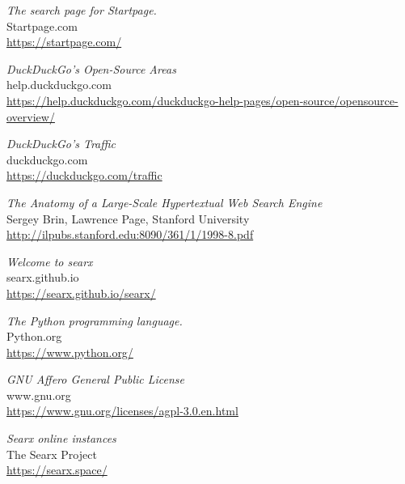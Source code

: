 \begin{thebibliography}{1}
    \emph{
    The search page for Startpage.
    }
    \\
    \color{gray}
    Startpage.com
    \\
    \color{black}
    \scriptsize
        \url{
            https://startpage.com/
        }
    \normalsize

    \emph{
    DuckDuckGo's Open-Source Areas
    }
    \\
    \color{gray}
    help.duckduckgo.com
    \\
    \color{black}
    \scriptsize
        \url{
            https://help.duckduckgo.com/duckduckgo-help-pages/open-source/opensource-overview/
        }
    \normalsize


\emph{
    DuckDuckGo's Traffic
}
\\
\color{gray}
duckduckgo.com
\\
\color{black}
\scriptsize
\url{
https://duckduckgo.com/traffic
        }
\normalsize

    \emph{
        The Anatomy of a Large-Scale Hypertextual Web Search Engine
    }
    \\
    \color{gray}
    Sergey Brin, Lawrence Page,
    \color{black}
        Stanford University
    \\
    \scriptsize
        \url{
            http://ilpubs.stanford.edu:8090/361/1/1998-8.pdf
        }
    \normalsize

    \emph{
    Welcome to searx
    }
    \\
    \color{gray}
    searx.github.io
    \\
    \color{black}
    \scriptsize
        \url{
            https://searx.github.io/searx/
        }
    \normalsize

\emph{
    The Python programming language.
}
\\
\color{gray}
    Python.org
\\
\color{black}
\scriptsize
\url{
https://www.python.org/
}
\normalsize


\emph{
    GNU Affero General Public License
    }
    \\
    \color{gray}
    www.gnu.org
    \\
    \color{black}
    \scriptsize
        \url{
https://www.gnu.org/licenses/agpl-3.0.en.html
        }
    \normalsize

\emph{
Searx online instances
}
\\
\color{gray}
The Searx Project
\\
\color{black}
\scriptsize
\url{
https://searx.space/
        }
\normalsize


\end{thebibliography}
